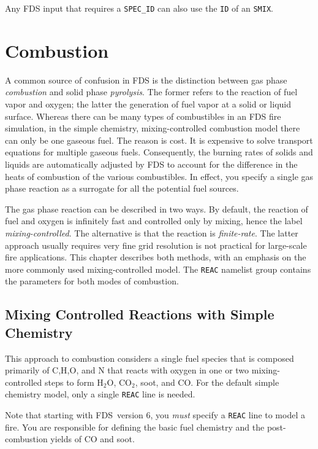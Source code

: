 \documentclass[11pt]{book}
\newcommand{\ct}{\tt\small}
\begin{document}
\noindent Any FDS input that requires a {\ct SPEC\_ID} can also use the {\ct ID} of an {\ct SMIX}.




\chapter{Combustion}

\label{chap:combustion}
\label{info:REAC}

A common source of confusion in FDS is the distinction between gas phase {\em combustion} and solid phase {\em pyrolysis}. The former
refers to the reaction of fuel vapor and oxygen; the latter the generation of fuel vapor at a solid or liquid surface. Whereas there
can be many types of combustibles in an FDS fire simulation, in the simple chemistry, mixing-controlled combustion model there can only be one gaseous fuel. The reason is cost.
It is expensive to
solve transport equations for multiple gaseous fuels. Consequently, the burning rates of solids and liquids are automatically adjusted by
FDS to account for the difference in the heats of combustion of the various combustibles. In effect, you specify a single gas phase
reaction as a surrogate for all the potential fuel sources.

The gas phase reaction can be described in two ways. By default, the reaction of fuel and oxygen is infinitely fast and controlled only by mixing, hence
the label {\em mixing-controlled}. The alternative is that the reaction is {\em finite-rate}. The latter approach usually requires very fine grid resolution is not
practical for large-scale fire applications. This chapter describes both methods, with an emphasis on the more
commonly used mixing-controlled model. The {\ct REAC} namelist group contains the parameters for both modes of combustion.


\section{Mixing Controlled Reactions with Simple Chemistry}

This approach to combustion considers a single fuel species that is composed primarily of C,H,O, and N that reacts with
oxygen in one or two mixing-controlled steps to form H$_2$O, CO$_2$, soot, and CO.
For the default simple chemistry model, only a single {\ct REAC} line is needed.

\begin{warning}
\noindent
Note that starting with FDS~version 6,
you {\em must} specify a {\ct REAC} line to model a fire.
You are responsible for defining the basic fuel chemistry and the post-combustion yields of CO and soot.
\end{warning}
\end{document}
